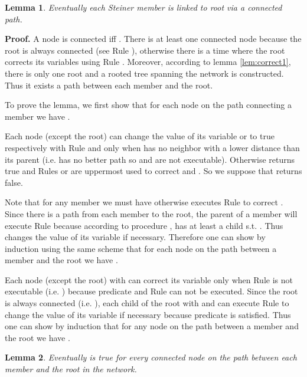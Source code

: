 \documentclass[11pt]{article}
\newtheorem{lemma}{Lemma}
\newenvironment{proof}{\noindent \begin{rm}{\textbf{Proof.} }}{\hspace*{\fill}\par\end{rm} \vspace{.3cm}}
\newcommand{\ARA}{}
\newcommand{\ARB}{}
\newcommand{\CRA}{}
\newcommand{\CRB}{}
\newcommand{\CRC}{}
\newcommand{\CRD}{}
\begin{document}
\begin{lemma}
\label{lem:correct2}
Eventually each Steiner member is linked to root via a connected path.
\end{lemma}

\begin{proof}
A node  is connected iff . There is at least one
connected node because the root is always connected (see Rule \CRA\/),
otherwise there is a time where the root corrects its variables using
Rule \CRA\/. Moreover, according to lemma \ref{lem:correct1}, there is
only one root and a rooted tree spanning the network is
constructed. Thus it exists a path between each member and the root.

To prove the lemma, we first show that for each node  on the path
connecting a member we have .

Each node  (except the root) can change the value of its variable
 or  to true respectively with Rule \CRB\/ and \CRC\/
only when  has no neighbor with a lower distance than its parent
(i.e.  has no better path so \ARA\/ and \ARB\/ are not
executable). Otherwise  returns true and Rules \ARA\/ or
\ARB\/ are uppermost used to correct  and . So we
suppose that  returns false.

Note that for any member  we must have  otherwise 
executes Rule \CRB\/ to correct . Since there is a path from each
member  to the root, the parent  of a member will execute Rule
\CRB\/ because according to procedure ,  has at
least a child  s.t. . Thus  changes the value of
its variable  if necessary. Therefore one can show by
induction using the same scheme that for each node  on the path
between a member and the root we have .

Each node  (except the root) with  can correct
its variable  only when Rule \CRB\/ is not executable
(i.e. ) because predicate  and
Rule \CRD\/ can not be executed. Since the root  is always connected
(i.e. ), each child  of the root with
 and  can execute Rule \CRD\/ to change
the value of its variable  if necessary because predicate
 is satisfied. Thus one can show by induction that
for any node on the path between a member and the root we have
.
\end{proof}

\begin{lemma}
\label{lem:correct3}
Eventually  is true for every connected node  on the path between each member and the root in the network.
\end{lemma}
\end{document}
